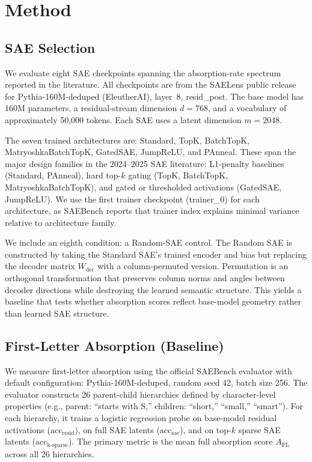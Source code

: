 \documentclass{article}
\begin{document}
\section{Method}

\subsection{SAE Selection}

We evaluate eight SAE checkpoints spanning the absorption-rate spectrum reported in the literature. All checkpoints are from the SAELens public release for Pythia-160M-deduped (EleutherAI), layer~8, resid\_post. The base model has 160M parameters, a residual-stream dimension $d = 768$, and a vocabulary of approximately 50,000 tokens. Each SAE uses a latent dimension $m = 2048$.

The seven trained architectures are: Standard, TopK, BatchTopK, MatryoshkaBatchTopK, GatedSAE, JumpReLU, and PAnneal. These span the major design families in the 2024--2025 SAE literature: L1-penalty baselines (Standard, PAnneal), hard top-$k$ gating (TopK, BatchTopK, MatryoshkaBatchTopK), and gated or thresholded activations (GatedSAE, JumpReLU). We use the first trainer checkpoint (trainer\_0) for each architecture, as SAEBench reports that trainer index explains minimal variance relative to architecture family.

We include an eighth condition: a Random-SAE control. The Random SAE is constructed by taking the Standard SAE's trained encoder and bias but replacing the decoder matrix $W_{\text{dec}}$ with a column-permuted version. Permutation is an orthogonal transformation that preserves column norms and angles between decoder directions while destroying the learned semantic structure. This yields a baseline that tests whether absorption scores reflect base-model geometry rather than learned SAE structure.

\subsection{First-Letter Absorption (Baseline)}

We measure first-letter absorption using the official SAEBench evaluator with default configuration: Pythia-160M-deduped, random seed 42, batch size 256. The evaluator constructs 26 parent-child hierarchies defined by character-level properties (e.g., parent: ``starts with S,'' children: ``short,'' ``small,'' ``smart''). For each hierarchy, it trains a logistic regression probe on base-model residual activations ($\text{acc}_{\text{resid}}$), on full SAE latents ($\text{acc}_{\text{sae}}$), and on top-$k$ sparse SAE latents ($\text{acc}_{\text{k-sparse}}$). The primary metric is the mean full absorption score $A_{\text{FL}}$ across all 26 hierarchies.
\end{document}
